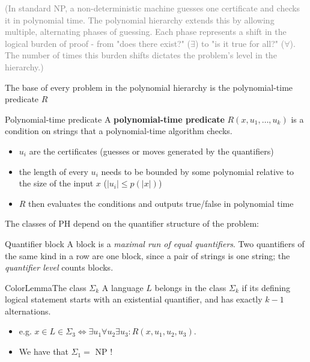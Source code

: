 \documentclass[a4paper, 11pt]{report}
\begin{document}
\textcolor{gray}{(In standard NP, a non-deterministic machine guesses one certificate and checks it in polynomial time. The polynomial hierarchy extends this by allowing multiple, alternating phases of guessing. Each phase represents a shift in the logical burden of proof - from "does there exist?" ($\exists$) to "is it true for all?" ($\forall$). The number of times this burden shifts dictates the problem's level in the hierarchy.)}

The base of every problem in the polynomial hierarchy is the polynomial-time predicate $R$

\begin{defframe}{Polynomial-time predicate}{}
A \textbf{polynomial-time predicate} $R(x, u_{1}, \dots, u_{k})$ is a condition on strings that a polynomial-time algorithm checks.
\begin{itemize}
    \item $u_{i}$ are the certificates (guesses or moves generated by the quantifiers)
    \item the length of every $u_{i}$ needs to be bounded by some polynomial relative to the size of the input $x$ ($|u_{i}| \leq p(|x|)$)
    \item $R$ then evaluates the conditions and outputs true/false in polynomial time
\end{itemize}
\end{defframe}

The classes of PH depend on the quantifier structure of the problem:

\begin{defframe}{Quantifier block}{}
    A block is a \textit{maximal run of equal quantifiers}. Two quantifiers of the same kind in a row are one block, since a pair of strings is one string; the \textit{quantifier level} counts blocks.
\end{defframe}

\begin{cframe}{ColorLemma}{The class $\Sigma_{k}$}{}
    A language $L$ belongs in the class $\Sigma_{k}$ if its defining logical statement starts with an existential quantifier, and has exactly $k-1$ alternations.
    \begin{itemize}
        \item e.g. $x \in L \in \Sigma_{3} \iff \exists u_1 \forall u_2 \exists u_3 : R(x, u_1, u_2, u_3)$.
    \end{itemize}
\end{cframe}

\begin{itemize}
    \item We have that $\Sigma_{1} =$ NP !
\end{itemize}
\end{document}
